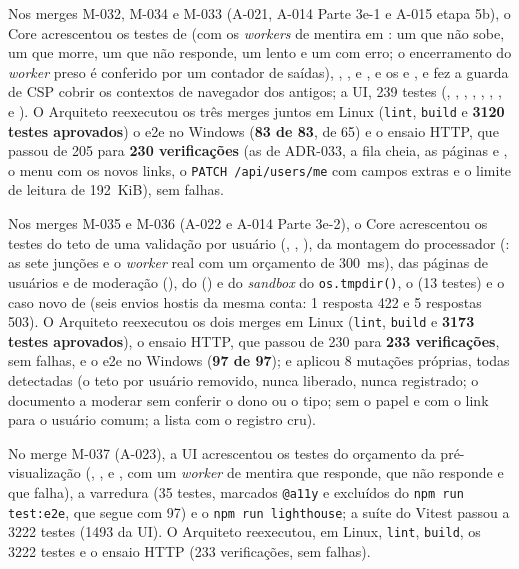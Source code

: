 Nos merges M-032, M-034 e M-033 (A-021, A-014 Parte 3e-1 e A-015 etapa 5b), o Core acrescentou os testes de  (com os \emph{workers} de mentira em : um que não sobe, um que morre, um que não responde, um lento e um com erro; o encerramento do \emph{worker} preso é conferido por um contador de saídas), , ,  e , e os   e , e fez a guarda de CSP cobrir os contextos de navegador dos  antigos; a UI, 239 testes (, , , , , , ,  e ). O Arquiteto reexecutou os três merges juntos em Linux (\texttt{lint}, \texttt{build} e \textbf{3120 testes aprovados}) o e2e no Windows (\textbf{83 de 83}, de 65) e o ensaio HTTP, que passou de 205 para \textbf{230 verificações} (as de ADR-033, a fila cheia, as páginas  e , o menu com os novos links, o \texttt{PATCH /api/users/me} com campos extras e o limite de leitura de 192~KiB), sem falhas.

Nos merges M-035 e M-036 (A-022 e A-014 Parte 3e-2), o Core acrescentou os testes do teto de uma validação por usuário (, , ), da montagem do processador (: as sete junções e o \emph{worker} real com um orçamento de 300~ms), das páginas de usuários e de moderação (), do  () e do \emph{sandbox} do \texttt{os.tmpdir()}, o   (13 testes) e o caso novo de  (seis envios hostis da mesma conta: 1 resposta 422 e 5 respostas 503). O Arquiteto reexecutou os dois merges em Linux (\texttt{lint}, \texttt{build} e \textbf{3173 testes aprovados}), o ensaio HTTP, que passou de 230 para \textbf{233 verificações}, sem falhas, e o e2e no Windows (\textbf{97 de 97}); e aplicou 8 mutações próprias, todas detectadas (o teto por usuário removido, nunca liberado, nunca registrado; o documento a moderar sem conferir o dono ou o tipo;  sem o papel e com o link para o usuário comum; a lista com o registro cru).

No merge M-037 (A-023), a UI acrescentou os testes do orçamento da pré-visualização (, ,  e , com um \emph{worker} de mentira que responde, que não responde e que falha), a varredura  (35 testes, marcados \texttt{@a11y} e excluídos do \texttt{npm run test:e2e}, que segue com 97) e o \texttt{npm run lighthouse}; a suíte do Vitest passou a 3222 testes (1493 da UI). O Arquiteto reexecutou, em Linux, \texttt{lint}, \texttt{build}, os 3222 testes e o ensaio HTTP (233 verificações, sem falhas).

